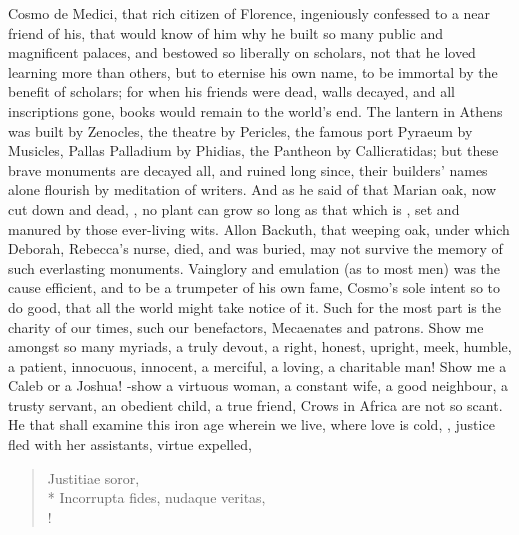 {\textlatin{Cosmo de Medici}, that rich citizen of Florence, ingeniously
confessed to a near friend of his, that would know of him why he built
so many public and magnificent palaces, and bestowed so liberally on
scholars, not that he loved learning more than others, but to
eternise his own name, to be immortal by the benefit of scholars;
for when his friends were dead, walls decayed, and all inscriptions
gone, books would remain to the world's end. The lantern in
Athens was built by Zenocles, the theatre by Pericles, the famous
port Pyraeum by Musicles, Pallas Palladium by Phidias, the Pantheon by
Callicratidas; but these brave monuments are decayed all, and ruined
long since, their builders' names alone flourish by meditation of
writers. And as he said of that Marian oak, now cut down and
dead, , no plant can grow so long as that which
is , set and manured by those ever-living wits. Allon
Backuth, that weeping oak, under which Deborah, Rebecca's nurse, died,
and was buried, may not survive the memory of such everlasting
monuments. Vainglory and emulation (as to most men) was the cause
efficient, and to be a trumpeter of his own fame, Cosmo's sole intent
so to do good, that all the world might take notice of it. Such for the
most part is the charity of our times, such our benefactors, Mecaenates
and patrons. Show me amongst so many myriads, a truly devout, a right,
honest, upright, meek, humble, a patient, innocuous, innocent, a
merciful, a loving, a charitable man! 
Show me a Caleb or a Joshua! -show a virtuous woman,
a constant wife, a good neighbour, a trusty servant, an obedient child,
a true friend, \etc{} Crows in Africa are not so scant. He that shall
examine this iron age wherein we live, where love is cold, , justice fled with her assistants, virtue
expelled,
%
\begin{latin}
\begin{verse}
Justitiae soror,\\*
Incorrupta fides, nudaque veritas,\\!
\end{verse}
\end{latin}

}
